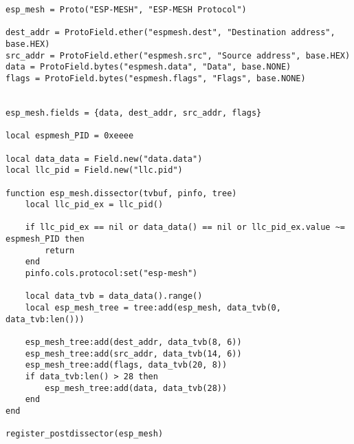 \begin{verbatim}
esp_mesh = Proto("ESP-MESH", "ESP-MESH Protocol")

dest_addr = ProtoField.ether("espmesh.dest", "Destination address", base.HEX)
src_addr = ProtoField.ether("espmesh.src", "Source address", base.HEX)
data = ProtoField.bytes("espmesh.data", "Data", base.NONE)
flags = ProtoField.bytes("espmesh.flags", "Flags", base.NONE)


esp_mesh.fields = {data, dest_addr, src_addr, flags}

local espmesh_PID = 0xeeee 

local data_data = Field.new("data.data")
local llc_pid = Field.new("llc.pid")

function esp_mesh.dissector(tvbuf, pinfo, tree)
    local llc_pid_ex = llc_pid()

    if llc_pid_ex == nil or data_data() == nil or llc_pid_ex.value ~= espmesh_PID then
        return
    end
    pinfo.cols.protocol:set("esp-mesh")

    local data_tvb = data_data().range()
    local esp_mesh_tree = tree:add(esp_mesh, data_tvb(0, data_tvb:len()))

    esp_mesh_tree:add(dest_addr, data_tvb(8, 6))
    esp_mesh_tree:add(src_addr, data_tvb(14, 6))
    esp_mesh_tree:add(flags, data_tvb(20, 8))
    if data_tvb:len() > 28 then
        esp_mesh_tree:add(data, data_tvb(28))
    end
end

register_postdissector(esp_mesh)
\end{verbatim}